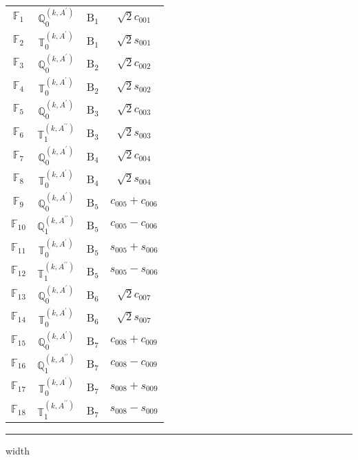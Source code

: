 \documentclass[fleqn,10pt,landscape]{article}
\begin{document}
\begin{itemize}
\begin{center}
\begin{longtable}{c|c|c|c}
$ \mathbb{F}_{1} $ & $\mathbb{Q}_{0}^{(k,A^{\prime})}$ & B$_{1}$ & $\sqrt{2} c_{001}$ \\
$ \mathbb{F}_{2} $ & $\mathbb{T}_{0}^{(k,A^{\prime})}$ & B$_{1}$ & $\sqrt{2} s_{001}$ \\ \hline
$ \mathbb{F}_{3} $ & $\mathbb{Q}_{0}^{(k,A^{\prime})}$ & B$_{2}$ & $\sqrt{2} c_{002}$ \\
$ \mathbb{F}_{4} $ & $\mathbb{T}_{0}^{(k,A^{\prime})}$ & B$_{2}$ & $\sqrt{2} s_{002}$ \\ \hline
$ \mathbb{F}_{5} $ & $\mathbb{Q}_{0}^{(k,A^{\prime})}$ & B$_{3}$ & $\sqrt{2} c_{003}$ \\
$ \mathbb{F}_{6} $ & $\mathbb{T}_{1}^{(k,A^{\prime\prime})}$ & B$_{3}$ & $\sqrt{2} s_{003}$ \\ \hline
$ \mathbb{F}_{7} $ & $\mathbb{Q}_{0}^{(k,A^{\prime})}$ & B$_{4}$ & $\sqrt{2} c_{004}$ \\
$ \mathbb{F}_{8} $ & $\mathbb{T}_{0}^{(k,A^{\prime})}$ & B$_{4}$ & $\sqrt{2} s_{004}$ \\ \hline
$ \mathbb{F}_{9} $ & $\mathbb{Q}_{0}^{(k,A^{\prime})}$ & B$_{5}$ & $c_{005} + c_{006}$ \\
$ \mathbb{F}_{10} $ & $\mathbb{Q}_{1}^{(k,A^{\prime\prime})}$ & B$_{5}$ & $c_{005} - c_{006}$ \\
$ \mathbb{F}_{11} $ & $\mathbb{T}_{0}^{(k,A^{\prime})}$ & B$_{5}$ & $s_{005} + s_{006}$ \\
$ \mathbb{F}_{12} $ & $\mathbb{T}_{1}^{(k,A^{\prime\prime})}$ & B$_{5}$ & $s_{005} - s_{006}$ \\ \hline
$ \mathbb{F}_{13} $ & $\mathbb{Q}_{0}^{(k,A^{\prime})}$ & B$_{6}$ & $\sqrt{2} c_{007}$ \\
$ \mathbb{F}_{14} $ & $\mathbb{T}_{0}^{(k,A^{\prime})}$ & B$_{6}$ & $\sqrt{2} s_{007}$ \\ \hline
$ \mathbb{F}_{15} $ & $\mathbb{Q}_{0}^{(k,A^{\prime})}$ & B$_{7}$ & $c_{008} + c_{009}$ \\
$ \mathbb{F}_{16} $ & $\mathbb{Q}_{1}^{(k,A^{\prime\prime})}$ & B$_{7}$ & $c_{008} - c_{009}$ \\
$ \mathbb{F}_{17} $ & $\mathbb{T}_{0}^{(k,A^{\prime})}$ & B$_{7}$ & $s_{008} + s_{009}$ \\
$ \mathbb{F}_{18} $ & $\mathbb{T}_{1}^{(k,A^{\prime\prime})}$ & B$_{7}$ & $s_{008} - s_{009}$ \\
\end{longtable}
\end{center}

 \hfil \hrule height 1mm width \textwidth \hfil


\end{itemize}
\end{document}

